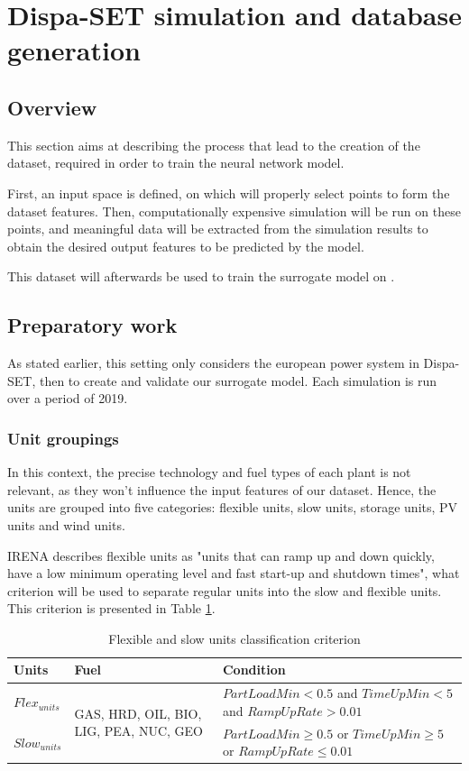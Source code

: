 \section{Dispa-SET simulation and database generation}

\subsection{Overview}

This section aims at describing the process that lead to the creation of the dataset, required in order to train the neural network model.

First, an input space is defined, on which will properly select points to form the dataset features. Then, computationally expensive simulation will be run on these points, and meaningful data will be extracted from the simulation results to obtain the desired output features to be predicted by the model.

This dataset will afterwards be used to train the surrogate model on \cite{surrogate_model}.

\subsection{Preparatory work}

As stated earlier, this setting only considers the european power system in Dispa-SET, then to create and validate our surrogate model. Each simulation is run over a period of 2019.

\subsubsection{Unit groupings}
In this context, the precise technology and fuel types of each plant is not relevant, as they won't influence the input features of our dataset. Hence, the units are grouped into five categories: flexible units, slow units, storage units, PV units and wind units.

IRENA \cite{irena} describes flexible units as "units that can ramp up and down quickly, have a low minimum operating level and fast start-up and shutdown times", what criterion will be used to separate regular units into the slow and flexible units. This criterion is presented in Table \ref{table:flex-vs-slow-unit}.

\begin{table}[h!]
    \centering
	\begin{tabular}{|l | l | p{8cm}|}
		\hline
		Units & Fuel & Condition \\
		\hline
		$Flex_{units}$ & \multirow{2}{3cm}{GAS, HRD, OIL, BIO, LIG, PEA, NUC, GEO} & $PartLoadMin<0.5$ and $TimeUpMin<5$ and $RampUpRate>0.01$\\ \cline{1-1} \cline{3-3}
		$Slow_{units}$ &  & $PartLoadMin\geq 0.5$ or $TimeUpMin \geq 5$ or $RampUpRate\leq 0.01$\\
		\hline
	\end{tabular}
	\caption{Flexible and slow units classification criterion}
	\label{table:flex-vs-slow-unit}
\end{table}

